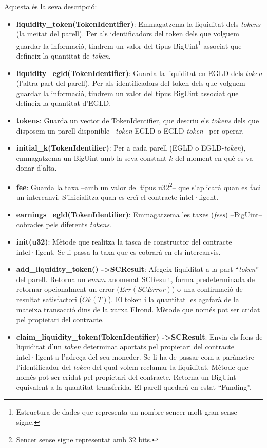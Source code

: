 \documentclass[11pt,a4paper]{article}
\begin{document}
Aquesta és la seva descripció:
\begin{itemize}
\item \textbf{liquidity\_token(TokenIdentifier)}: Emmagatzema la liquiditat dels \textit{tokens} (la meitat del parell). Per als identificadors del token dels que volguem guardar la informació, tindrem un valor del tipus BigUint\footnote{Estructura de dades que representa un nombre sencer molt gran sense signe.} associat que defineix la quantitat de \textit{token}.
\item \textbf{liquidity\_egld(TokenIdentifier)}: Guarda la liquiditat en EGLD dels \textit{token} (l'altra part del parell). Per als identificadors del token dels que volguem guardar la informació, tindrem un valor del tipus BigUint associat que defineix la quantitat d'EGLD.
\item \textbf{tokens}: Guarda un vector de TokenIdentifier, que descriu els \textit{tokens} dels que disposem un parell disponible –\textit{token}-EGLD o EGLD-\textit{token}– per operar.
\item \textbf{initial\_k(TokenIdentifier)}: Per a cada parell (EGLD o EGLD-\textit{token}), emmagatzema un BigUint amb la seva constant \(k\) del moment en què es va donar d'alta. 
\item \textbf{fee}: Guarda la taxa –amb un valor del tipus u32\footnote{Sencer sense signe representat amb 32 bits.}– que s'aplicarà quan es faci un intercanvi. S'inicialitza quan es creï el contracte intel·ligent.
\item \textbf{earnings\_egld(TokenIdentifier)}: Emmagatzema les taxes (\textit{fees}) –BigUint– cobrades pels diferents \textit{tokens}.
\item \textbf{init(u32)}: Mètode que realitza la tasca de constructor del contracte intel·ligent. Se li passa la taxa que es cobrarà en els intercanvis.
\item \textbf{add\_liquidity\_token() -\textgreater SCResult}: Afegeix liquiditat a la part ``\textit{token}'' del parell. Retorna un \(enum\) anomenat SCResult, forma predeterminada de retornar opcionalment un error (\(Err(SCError)\)) o una confirmació de resultat satisfactori (\(Ok(T)\)). El token i la quantitat les agafarà de la mateixa transacció dins de la xarxa Elrond. Mètode que només pot ser cridat pel propietari del contracte.
\item \textbf{claim\_liquidity\_token(TokenIdentifier)  -\textgreater SCResult}: Envia els fons de liquiditat d'un \textit{token} determinat aportats pel propietari del contracte intel·ligent a l'adreça del seu moneder. Se li ha de passar com a paràmetre l'identificador del \textit{token} del qual volem reclamar la liquiditat. Mètode que només pot ser cridat pel propietari del contracte. Retorna un BigUint equivalent a la quantitat transferida. El parell quedarà en estat ``Funding''.

\end{itemize}
\end{document}
